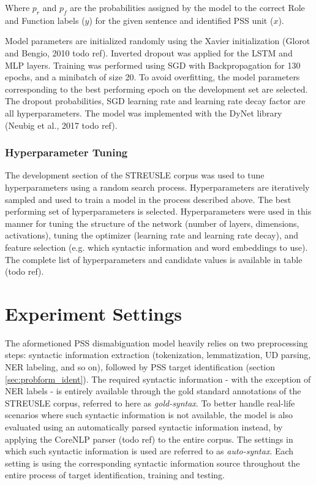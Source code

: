 Where $p_r$ and $p_f$ are the probabilities assigned by the model to the correct Role and Function labels ($y$) for the given sentence and identified PSS unit ($x$).

Model parameters are initialized randomly using the Xavier initialization (Glorot and Bengio, 2010 todo ref).  Inverted dropout was applied for the LSTM and MLP layers. Training was performed using SGD with Backpropagation for 130 epochs, and a minibatch of size 20. To avoid overfitting, the model parameters corresponding to the best performing epoch on the development set are selected. The dropout probabilities, SGD learning rate and learning rate decay factor are all hyperparameters. The model was implemented with the DyNet library (Neubig et al., 2017 todo ref).

\subsubsection{Hyperparameter Tuning}

The development section of the STREUSLE corpus was used to tune hyperparameters using a random search process. Hyperparameters are iteratively sampled and used to train a model in the process described above. The best performing set of hyperparameters is selected. Hyperparameters were used in this manner for tuning the structure of the network (number of layers, dimensions, activations), tuning the optimizer (learning rate and learning rate decay), and feature selection (e.g. which syntactic information and word embeddings to use). The complete list of hyperparameters and candidate values is available in table (todo ref).

\section{Experiment Settings} \label{sec:psssettings}

The aformetioned PSS dismabiguation model heavily relies on two preprocessing steps: syntactic information extraction (tokenization, lemmatization, UD parsing, NER labeling, and so on), followed by PSS target identification (section \ref{sec:probform_ident}). The required syntactic information - with the exception of NER labels - is entirely available through the gold standard annotations of the STREUSLE corpus, referred to here as \textit{gold-syntax}. To better handle real-life scenarios where such syntactic information is not available, the model is also evaluated using an automatically parsed syntactic information instead, by applying the CoreNLP parser (todo ref) to the entire corpus. The settings in which such syntactic information is used are referred to as \textit{auto-syntax}. Each setting is using the corresponding syntactic information source throughout the entire process of target identification, training and testing. 

